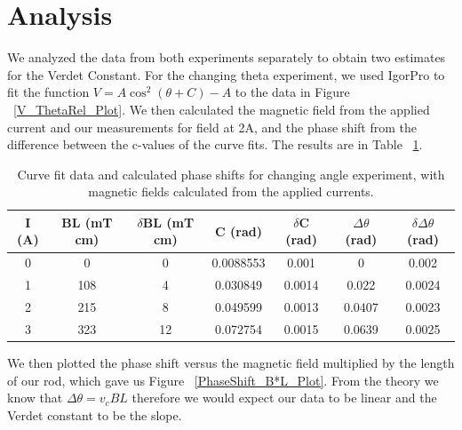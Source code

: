 \documentclass[prb,preprint]{revtex4-1}
\begin{document}
\section{Analysis}

We analyzed the data from both experiments separately to obtain two estimates for the Verdet Constant.  For the changing theta experiment, we used IgorPro to fit the function $V = A \cos ^2 (\theta + C) - A$ to the data in Figure ~\ref{V_ThetaRel_Plot}.  We then calculated the magnetic field from the applied current and our measurements for field at 2A, and the phase shift from the difference between the c-values of the curve fits.  The results are in Table ~\ref{B*L_PhaseShift_Table}.  

\begin{table}[h!]
\centering
\caption{Curve fit data and calculated phase shifts for changing angle experiment, with magnetic fields calculated from the applied currents.}
\begin{ruledtabular}
\begin{tabular}{c c c c c c c}
I (A) & BL (mT cm) & $\delta$BL (mT cm) & C (rad)& $\delta$C (rad) & $\Delta \theta$ (rad) & $\delta \Delta \theta$ (rad)\\
\hline	%
0 &  0  & 0 &  0.0088553 & 0.001 & 0 & 0.002    \\
1 & 108 & 4  & 0.030849  & 0.0014 & 0.022  & 0.0024 \\
2 & 215 & 8 & 0.049599  & 0.0013 & 0.0407 & 0.0023  \\
3 & 323 & 12 & 0.072754  & 0.0015 & 0.0639 & 0.0025 
\end{tabular}
\end{ruledtabular}
\label{B*L_PhaseShift_Table}
\end{table}

We then plotted the phase shift versus the magnetic field multiplied by the length of our rod, which gave us Figure ~\ref{PhaseShift_B*L_Plot}. From the theory we know that $\Delta \theta = v_c B L$ therefore we would expect our data to be linear and the Verdet constant to be the slope.
\end{document}
